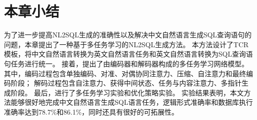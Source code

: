 \section{本章小结}

为了进一步提高NL2SQL生成的准确性以及解决中文自然语言生成SQL查询语句的问题，本章提出了一种基于多任务学习的NL2SQL生成方法。
本方法设计了TCR模板，将中文自然语言转换为英文自然语言任务和英文自然语言转换为SQL查询语句任务进行统一。
接着，提出了由编码器和解码器构成的多任务学习网络模型。
其中，编码过程包含单独编码、对准、对偶协同注意力、压缩、自注意力和最终编码阶段；
解码过程包含自注意力、获得中间状态、任务与内容注意力、多指针生成阶段。
最后，进行了多任务学习实验和优化策略实验。
实验结果表明，本文方法能够很好地完成中文自然语言生成SQL语言任务，逻辑形式准确率和数据库执行准确率达到78.7\%和86.1\%，同时还具有很好的可拓展性。
